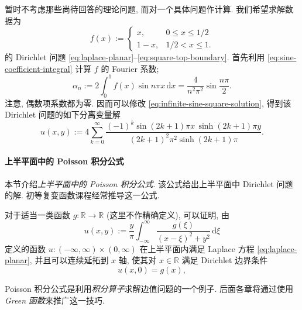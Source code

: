\begin{Example}
\label{ex:tent-dirichlet-data}
暂时不考虑那些尚待回答的理论问题, 而对一个具体问题作计算. 我们希望求解数据为
\begin{equation}\label{eq:tent-boundary-data}
f(x):=\begin{cases}x,&0\leq x\leq1/2\\1-x,&1/2<x\leq1.\end{cases}
\end{equation}
的 Dirichlet 问题 \eqref{eq:laplace-planar}--\eqref{eq:square-top-boundary}. 首先利用 \eqref{eq:sine-coefficient-integral} 计算 $f$ 的 Fourier 系数;
\begin{equation}\label{eq:tent-sine-coefficients}
\alpha_n:=2\int_0^1f(x)\sin n\pi x\,\mathrm{d}x=\dfrac{4}{n^2\pi^2}\sin\dfrac{n\pi}{2}.
\end{equation}
注意, 偶数项系数都为零. 因而可以修改 \eqref{eq:infinite-sine-square-solution}, 得到该 Dirichlet 问题的如下分离变量解
\begin{equation}\label{eq:tent-square-solution}
u(x,y):=4\sum_{k=0}^{\infty}\dfrac{(-1)^k\sin(2k+1)\pi x\,\sinh(2k+1)\pi y}{(2k+1)^2\pi^2\sinh(2k+1)\pi}.
\end{equation}

\end{Example}

\paragraph*{上半平面中的 Poisson 积分公式}

本节介绍\emph{上半平面中的 Poisson 积分公式}. 该公式给出上半平面中 Dirichlet 问题的解. 初等复变函数课程经常推导这一公式.

对于适当一类函数 $g:\mathbb{R}\to\mathbb{R}$ (这里不作精确定义), 可以证明, 由
\begin{equation}\label{eq:poisson-upper-half-plane}
u(x,y):=\dfrac{y}{\pi}\int_{-\infty}^{\infty}\dfrac{g(\xi)}{(x-\xi)^2+y^2}\,\mathrm{d}\xi
\end{equation}
定义的函数 $u:(-\infty,\infty)\times(0,\infty)$ 在上半平面内满足 Laplace 方程 \eqref{eq:laplace-planar}, 并且可以连续延拓到 $x$ 轴, 使其对 $x\in\mathbb{R}$ 满足 Dirichlet 边界条件
\begin{equation}\label{eq:poisson-dirichlet-data}
u(x,0)=g(x),
\end{equation}


Poisson 积分公式是利用\emph{积分算子}求解边值问题的一个例子. 后面各章将通过使用 \emph{Green 函数}来推广这一技巧.


